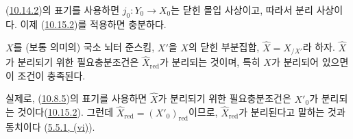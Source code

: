 (\hyperref[I.10.14.2-ko]{10.14.2})의 표기를 사용하면
$j_0:Y_0\to X_0$는 닫힌 몰입 사상이고, 따라서 분리 사상이다. 이제
(\hyperref[I.10.15.2-ko]{10.15.2})를 적용하면 충분하다.

\begin{proposition}[10.15.7]
\label{I.10.15.7-ko}
$X$를 (보통 의미의) 국소 뇌터 준스킴, $X'$을 $X$의 닫힌 부분집합,
$\widehat{X}=X_{/X'}$라 하자. $\widehat{X}$가 분리되기 위한
필요충분조건은 $\widehat{X}_{\mathrm{red}}$가 분리되는 것이며,
특히 $X$가 분리되어 있으면 이 조건이 충족된다.
\end{proposition}

실제로, (\hyperref[I.10.8.5-ko]{10.8.5})의 표기를 사용하면
$\widehat{X}$가 분리되기 위한 필요충분조건은 $X'_0$가 분리되는
것이다(\hyperref[I.10.15.2-ko]{10.15.2}). 그런데
$\widehat{X}_{\mathrm{red}}=(X'_0)_{\mathrm{red}}$이므로,
$\widehat{X}_{\mathrm{red}}$가 분리된다고 말하는 것과 동치이다
(\hyperref[I.5.5.1-ko]{5.5.1, (vi)}).
